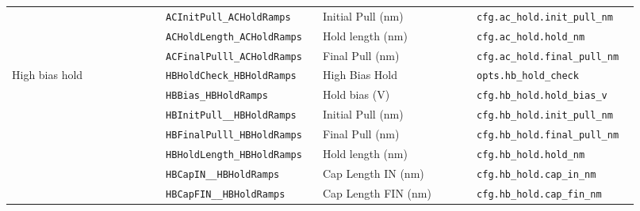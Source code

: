 \begin{longtable}{@{}>{\raggedright\arraybackslash}p{0.230\linewidth}>{\raggedright\arraybackslash}p{0.230\linewidth}>{\raggedright\arraybackslash}p{0.230\linewidth}>{\raggedright\arraybackslash}p{0.230\linewidth}@{}}
 & \texttt{ACInit\discretionary{}{}{}Pull\_\discretionary{}{}{}ACHold\discretionary{}{}{}Ramps} & Initial Pull (nm) & \texttt{cfg.\discretionary{}{}{}ac\_\discretionary{}{}{}hold.\discretionary{}{}{}init\_\discretionary{}{}{}pull\_\discretionary{}{}{}nm} \\
 & \texttt{ACHold\discretionary{}{}{}Length\_\discretionary{}{}{}ACHold\discretionary{}{}{}Ramps} & Hold length (nm) & \texttt{cfg.\discretionary{}{}{}ac\_\discretionary{}{}{}hold.\discretionary{}{}{}hold\_\discretionary{}{}{}nm} \\
 & \texttt{ACFinal\discretionary{}{}{}Pulll\_\discretionary{}{}{}ACHold\discretionary{}{}{}Ramps} & Final Pull (nm) & \texttt{cfg.\discretionary{}{}{}ac\_\discretionary{}{}{}hold.\discretionary{}{}{}final\_\discretionary{}{}{}pull\_\discretionary{}{}{}nm} \\
High bias hold & \texttt{HBHold\discretionary{}{}{}Check\_\discretionary{}{}{}HBHold\discretionary{}{}{}Ramps} & High Bias Hold & \texttt{opts.\discretionary{}{}{}hb\_\discretionary{}{}{}hold\_\discretionary{}{}{}check} \\
 & \texttt{HBBias\_\discretionary{}{}{}HBHold\discretionary{}{}{}Ramps} & Hold bias (V) & \texttt{cfg.\discretionary{}{}{}hb\_\discretionary{}{}{}hold.\discretionary{}{}{}hold\_\discretionary{}{}{}bias\_\discretionary{}{}{}v} \\
 & \texttt{HBInit\discretionary{}{}{}Pull\_\discretionary{}{}{}\_\discretionary{}{}{}HBHold\discretionary{}{}{}Ramps} & Initial Pull (nm) & \texttt{cfg.\discretionary{}{}{}hb\_\discretionary{}{}{}hold.\discretionary{}{}{}init\_\discretionary{}{}{}pull\_\discretionary{}{}{}nm} \\
 & \texttt{HBFinal\discretionary{}{}{}Pulll\_\discretionary{}{}{}HBHold\discretionary{}{}{}Ramps} & Final Pull (nm) & \texttt{cfg.\discretionary{}{}{}hb\_\discretionary{}{}{}hold.\discretionary{}{}{}final\_\discretionary{}{}{}pull\_\discretionary{}{}{}nm} \\
 & \texttt{HBHold\discretionary{}{}{}Length\_\discretionary{}{}{}HBHold\discretionary{}{}{}Ramps} & Hold length (nm) & \texttt{cfg.\discretionary{}{}{}hb\_\discretionary{}{}{}hold.\discretionary{}{}{}hold\_\discretionary{}{}{}nm} \\
 & \texttt{HBCap\discretionary{}{}{}IN\_\discretionary{}{}{}\_\discretionary{}{}{}HBHold\discretionary{}{}{}Ramps} & Cap Length IN (nm) & \texttt{cfg.\discretionary{}{}{}hb\_\discretionary{}{}{}hold.\discretionary{}{}{}cap\_\discretionary{}{}{}in\_\discretionary{}{}{}nm} \\
 & \texttt{HBCap\discretionary{}{}{}FIN\_\discretionary{}{}{}\_\discretionary{}{}{}HBHold\discretionary{}{}{}Ramps} & Cap Length FIN (nm) & \texttt{cfg.\discretionary{}{}{}hb\_\discretionary{}{}{}hold.\discretionary{}{}{}cap\_\discretionary{}{}{}fin\_\discretionary{}{}{}nm} \\
\bottomrule
\end{longtable}
\normalsize

